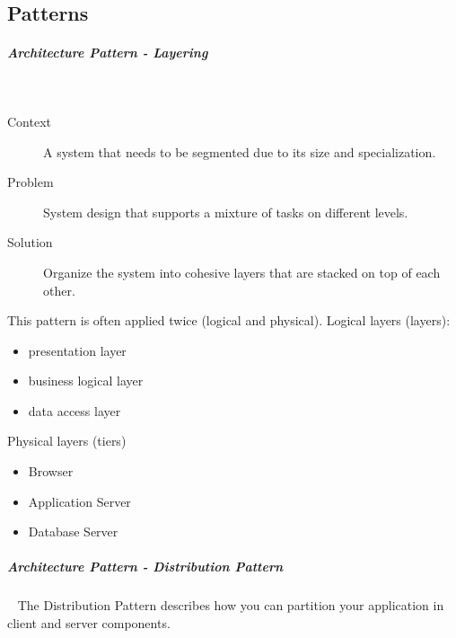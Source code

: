 \documentclass[11pt,twoside,landscape]{article}
\begin{document}
\begin{multicols}{3}
\section{Patterns}
\label{sec:org900d0fe}
\subparagraph{Architecture Pattern - Layering} \
\label{sec:org5bedbac}
\begin{description}
\item[{Context}] A system that needs to be segmented due to its size and specialization.
\item[{Problem}] System design that supports a mixture of tasks on different levels.
\item[{Solution}] Organize the system into cohesive layers that are stacked on top of each other.
\end{description}


This pattern is often applied twice (logical and physical).
Logical layers (layers):
\begin{itemize}
\item presentation layer
\item business logical layer
\item data access layer
\end{itemize}

Physical layers (tiers)
\begin{itemize}
\item Browser
\item Application Server
\item Database Server
\end{itemize}
\subparagraph{Architecture Pattern - Distribution Pattern} \
\label{sec:org96f7ff4}
The Distribution Pattern describes how you can partition your application in client and server components.


\end{multicols}
\end{document}
